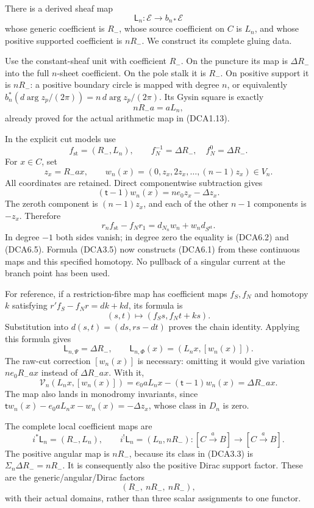 There is a derived sheaf map \[
\mathsf L_n:\mathscr E\longrightarrow b_{n*}\mathscr E
\tag{DCA6.1}
\] whose generic coefficient is \(R_-\), whose source coefficient on
\(C\) is \(L_n\), and whose positive supported coefficient is \(nR_-\).
We construct its complete gluing data.

Use the constant-sheaf unit with coefficient \(R_-\). On the puncture
its map is \(\Delta R_-\) into the full \(n\)-sheet coefficient. On the
pole stalk it is \(R_-\). On positive support it is \(nR_-\): a positive
boundary circle is mapped with degree \(n\), or equivalently
\(b_n^*(d\arg z_p/(2\pi))=n\,d\arg z_p/(2\pi)\). Its Gysin square is
exactly \[
nR_-a=aL_n,
\tag{DCA6.2}
\] already proved for the actual arithmetic map in (DCA1.13).

In the explicit cut models use \[
f_{\mathrm{st}}=(R_-,L_n),\qquad
f_N^{-1}=\Delta R_-,\quad f_N^0=\Delta R_-.
\tag{DCA6.3}
\] For \(x\in C\), set \[
z_x=R_-ax,\qquad
w_n(x)=(0,z_x,2z_x,\ldots,(n-1)z_x)\in V_n.
\tag{DCA6.4}
\] All coordinates are retained. Direct componentwise subtraction gives
\[
(\mathsf t-1)w_n(x)=ne_0z_x-\Delta z_x.
\tag{DCA6.5}
\] The zeroth component is \((n-1)z_x\), and each of the other \(n-1\)
components is \(-z_x\). Therefore \[
r_nf_{\mathrm{st}}-f_Nr_1=d_{N_n}w_n+w_nd_{S^{\mathrm{st}}}.
\tag{DCA6.6}
\] In degree \(-1\) both sides vanish; in degree zero the equality is
(DCA6.2) and (DCA6.5). Formula (DCA3.5) now constructs (DCA6.1) from
these continuous maps and this specified homotopy. No pullback of a
singular current at the branch point has been used.

For reference, if a restriction-fibre map has coefficient maps
\(f_S,f_N\) and homotopy \(k\) satisfying \(r'f_S-f_Nr=dk+kd\), its
formula is \[
(s,t)\longmapsto(f_Ss,f_Nt+ks).
\tag{DCA6.7}
\] Substitution into \(d(s,t)=(ds,rs-dt)\) proves the chain identity.
Applying this formula gives \[
\boxed{\mathsf L_{n,\Psi}=\Delta R_-,\qquad
\mathsf L_{n,\Phi}(x)=(L_nx,[w_n(x)]).}
\tag{DCA6.8}
\] The raw-cut correction \([w_n(x)]\) is necessary: omitting it would
give variation \(ne_0R_-ax\) instead of \(\Delta R_-ax\). With it, \[
\mathcal V_n(L_nx,[w_n(x)])
=e_0aL_nx-(\mathsf t-1)w_n(x)=\Delta R_-ax.
\tag{DCA6.9}
\] The map also lands in monodromy invariants, since
\(\mathsf t w_n(x)-e_0aL_nx-w_n(x)=-\Delta z_x\), whose class in \(D_n\)
is zero.

The complete local coefficient maps are \[
\boxed{i^*\mathsf L_n=(R_-,L_n),\qquad
i^!\mathsf L_n=(L_n,nR_-):[C\xrightarrow{a}B]\to[C\xrightarrow{a}B].}
\tag{DCA6.10}
\] The positive angular map is \(nR_-\), because its class in (DCA3.3)
is \(\Sigma_n\Delta R_-=nR_-\). It is consequently also the positive
Dirac support factor. These are the generic/angular/Dirac factors \[
(R_-,\ nR_-,\ nR_-),
\tag{DCA6.11}
\] with their actual domains, rather than three scalar assignments to
one functor.

